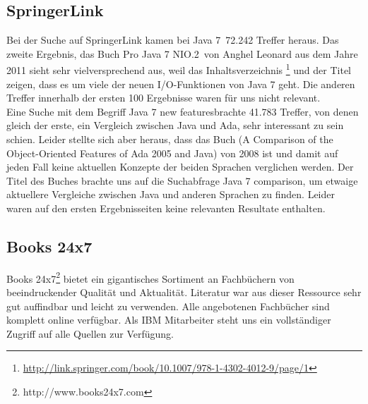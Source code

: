 \subsection*{SpringerLink}
Bei der Suche auf SpringerLink kamen bei \glqq Java 7\grqq~72.242 Treffer heraus. Das zweite Ergebnis, das Buch \glqq Pro Java 7
NIO.2\grqq\cite{b247nio2}~von Anghel Leonard aus dem Jahre 2011 sieht sehr vielversprechend aus, weil das Inhaltsverzeichnis
\footnote{\url{http://link.springer.com/book/10.1007/978-1-4302-4012-9/page/1}} und der Titel zeigen, dass es um viele der neuen
I/O-Funktionen von Java 7 geht.
Die anderen Treffer innerhalb der ersten 100 Ergebnisse waren für uns nicht relevant.\\

Eine Suche mit dem Begriff \glqq Java 7 new features\grqq brachte 41.783 Treffer, von denen gleich der erste, ein Vergleich zwischen
Java und Ada, sehr interessant zu sein schien. Leider stellte sich aber heraus, dass das Buch 
(\glqq A Comparison of the Object-Oriented Features of Ada 2005 and Java\grqq\cite{adacomparison}) von 2008 ist 
und damit auf jeden Fall keine aktuellen Konzepte der beiden Sprachen verglichen werden.
Der Titel des Buches brachte uns auf die Suchabfrage \glqq Java 7 comparison\grqq, um etwaige aktuellere Vergleiche zwischen
Java und anderen Sprachen zu finden. Leider waren auf den ersten Ergebnisseiten keine relevanten
Resultate enthalten.

%

\subsection*{Books 24x7}
Books 24x7\footnote{http://www.books24x7.com} bietet ein gigantisches Sortiment an Fachbüchern von beeindruckender Qualität und Aktualität. Literatur war aus dieser Ressource sehr gut auffindbar und leicht zu verwenden. Alle angebotenen Fachbücher sind komplett online verfügbar. Als IBM Mitarbeiter steht uns ein vollständiger Zugriff auf alle Quellen zur Verfügung.\\

